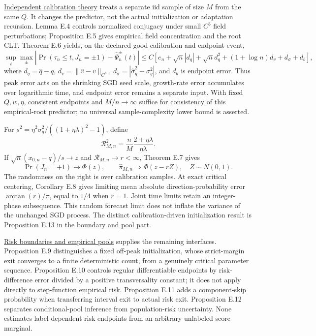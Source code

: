 \href{calibration.md}{Independent calibration theory} treats a separate
iid sample of size \(M\) from the same \(Q\). It changes the predictor,
not the actual initialization or adaptation recursion. Lemma E.4
controls normalized conjugacy under small \(C^3\) field perturbations;
Proposition E.5 gives empirical field concentration and the root CLT.
Theorem E.6 yields, on the declared good-calibration and endpoint event,
\[
\sup_t\max_\pm |\Pr(\tau_n\le t,J_n=\pm1)-\widehat\Psi_n^\pm(t)|
\le C[e_n+\sqrt n|d_q|+\sqrt n d_q^2
 +(1+\log n)d_v+d_\sigma+d_b],
\] where \(d_q=\widehat q-q\), \(d_v=\|\widehat v-v\|_{C^3}\),
\(d_\sigma=|\widehat\sigma_g^2-\sigma_g^2|\), and \(d_b\) is endpoint
error. Thus peak error acts on the shrinking SGD seed scale, growth-rate
error accumulates over logarithmic time, and endpoint error remains a
separate input. With fixed \(Q,w,\eta\), consistent endpoints and
\(M/n\to\infty\) suffice for consistency of this empirical-root
predictor; no universal sample-complexity lower bound is asserted.

For \(s^2=\eta^2\sigma_g^2/((1+\eta\lambda)^2-1)\), define \[
\mathcal R_{M,n}^2=\frac nM\frac{2+\eta\lambda}{\eta\lambda}.
\] If \(\sqrt n(x_{0,n}-q)/s\to z\) and
\(\mathcal R_{M,n}\to r<\infty\), Theorem E.7 gives \[
\Pr(J_n=+1)\to\Phi(z),\qquad
\widehat\pi_{M,n}\Rightarrow\Phi(z-rZ),\quad Z\sim N(0,1).
\] The randomness on the right is over calibration samples. At exact
critical centering, Corollary E.8 gives limiting mean absolute
direction-probability error \(\arctan(r)/\pi\), equal to \(1/4\) when
\(r=1\). Joint time limits retain an integer-phase subsequence. This
random forecast limit does not inflate the variance of the unchanged SGD
process. The distinct calibration-driven initialization result is
Proposition E.13 in \href{risk_boundaries.md}{the boundary and pool
part}.

\href{risk_boundaries.md}{Risk boundaries and empirical pools} supplies
the remaining interfaces. Proposition E.9 distinguishes a fixed off-peak
initialization, whose strict-margin exit converges to a finite
deterministic count, from a genuinely critical parameter sequence.
Proposition E.10 controls regular differentiable endpoints by
risk-difference error divided by a positive transversality constant; it
does not apply directly to step-function empirical risk. Proposition
E.11 adds a component-skip probability when transferring interval exit
to actual risk exit. Proposition E.12 separates conditional-pool
inference from population-risk uncertainty. None estimates
label-dependent risk endpoints from an arbitrary unlabeled score
marginal.

